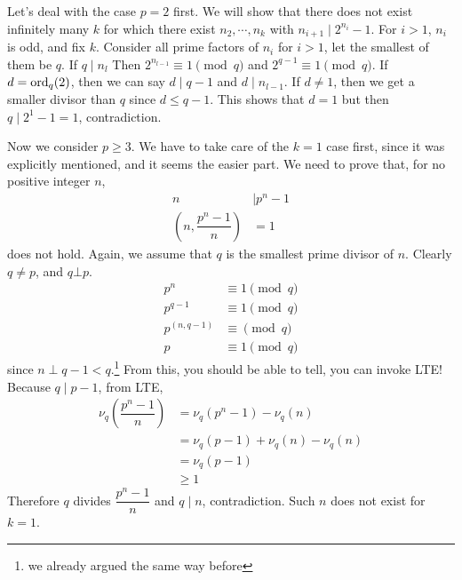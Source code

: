 \documentclass[problems.tex]{subfile}
\begin{document}
	\begin{solution}
		Let's deal with the case $p=2$ first. We will show that there does not exist infinitely many $k$ for which there exist $n_2,\cdots,n_k$ with $n_{i+1}\mid 2^{n_i}-1$. For $i>1$, $n_i$ is odd, and fix $k$. Consider all prime factors of $n_i$ for $i>1$, let the smallest of them be $q$. If $q\mid n_{l}$ Then $2^{n_{l-1}}\equiv1\pmod q$ and $2^{q-1}\equiv1\pmod q$. If $d=\operatorname{ord}_q(2)$, then we can say $d\mid q-1$ and $d\mid n_{l-1}$. If $d\neq1$, then we get a smaller divisor than $q$ since $d\leq q-1$. This shows that $d=1$ but then $q\mid 2^1-1=1$, contradiction.

		Now we consider $p\geq3$. We have to take care of the $k=1$ case first, since it was explicitly mentioned, and it seems the easier part. We need to prove that, for no positive integer $n$,
			\begin{align*}
				n
					& \mid p^n-1\\
				\left(n,\dfrac{p^n-1}{n}\right) & = 1
			\end{align*}
		does not hold. Again, we assume that $q$ is the smallest prime divisor of $n$. Clearly $q\neq p$, and $q\bot p$.
			\begin{align*}
				p^n & \equiv1\pmod q\\
				p^{q-1}& \equiv1\pmod q\\
				p^{(n,q-1)} & \equiv\pmod q\\
				p & \equiv1\pmod q
			\end{align*}
		since $n\perp q-1<q$.\footnote{we already argued the same way before} From this, you should be able to tell, you can invoke LTE! Because $q\mid p-1$, from LTE,
			\begin{align*}
				\nu_q\left(\dfrac{p^n-1}{n}\right)  & = \nu_q\left(p^n-1\right)-\nu_q(n)\\
													& = \nu_q(p-1)+\nu_q(n)-\nu_q(n)\\
													& = \nu_q(p-1)\\
													&\geq1
			\end{align*}
		Therefore $q$ divides $\dfrac{p^n-1}{n}$ and $q\mid n$, contradiction. Such $n$ does not exist for $k=1$.


\end{solution}
\end{document}
